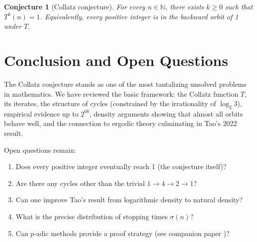 \documentclass[12pt,a4paper]{article}
\newtheorem{conjecture}[theorem]{Conjecture}
\begin{document}
\begin{conjecture}[Collatz conjecture]\label{conj:collatz}
For every $n \in \mathbb{N}$, there exists $k \geq 0$ such that $T^k(n) = 1$.
Equivalently, every positive integer is in the backward orbit of 1 under $T$.
\end{conjecture}

\section{Conclusion and Open Questions}

The Collatz conjecture stands as one of the most tantalizing unsolved problems in
mathematics. We have reviewed the basic framework: the Collatz function $T$, its
iterates, the structure of cycles (constrained by the irrationality of $\log_2 3$),
empirical evidence up to $2^{68}$, density arguments showing that almost all orbits
behave well, and the connection to ergodic theory culminating in Tao's 2022 result.

Open questions remain:
\begin{enumerate}
  \item Does every positive integer eventually reach 1 (the conjecture itself)?
  \item Are there any cycles other than the trivial $1 \to 4 \to 2 \to 1$?
  \item Can one improve Tao's result from logarithmic density to natural density?
  \item What is the precise distribution of stopping times $\sigma(n)$?
  \item Can $p$-adic methods provide a proof strategy (see companion paper \cite{Fuhrmann2026b})?
\end{enumerate}
\end{document}
